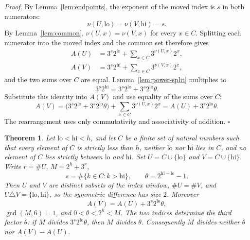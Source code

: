 \documentclass[11pt,letterpaper]{article}
\newtheorem{theorem}{Theorem}
\newenvironment{proof}{\noindent\textit{Proof.}}{\hfill\(\square\)}
\begin{document}
\begin{proof}
By Lemma~\ref{lem:endpoints}, the exponent of the moved index is \(s\) in both numerators:
\[
\nu(U,\mathrm{lo})=\nu(V,\mathrm{hi})=s.
\]
By Lemma~\ref{lem:common}, \(\nu(U,x)=\nu(V,x)\) for every \(x\in C\). Splitting each numerator into the moved index and the common set therefore gives
\begin{align*}
A(U)&=3^{s}2^{\mathrm{lo}}+\sum_{x\in C}3^{\nu(U,x)}2^{x},\\
A(V)&=3^{s}2^{\mathrm{hi}}+\sum_{x\in C}3^{\nu(V,x)}2^{x},
\end{align*}
and the two sums over \(C\) are equal. Lemma~\ref{lem:power-split} multiplies to
\[
3^{s}2^{\mathrm{hi}}=3^{s}2^{\mathrm{lo}}+3^{s}2^{\mathrm{lo}}\theta.
\]
Substitute this identity into \(A(V)\) and use equality of the sums over \(C\):
\[
A(V)=\bigl(3^{s}2^{\mathrm{lo}}+3^{s}2^{\mathrm{lo}}\theta\bigr)+\sum_{x\in C}3^{\nu(U,x)}2^{x}
=A(U)+3^{s}2^{\mathrm{lo}}\theta.
\]
The rearrangement uses only commutativity and associativity of addition.
\end{proof}

\begin{theorem}
\label{thm:nocrossing}
Let \(\mathrm{lo}<\mathrm{hi}<h\), and let \(C\) be a finite set of natural numbers such that every element of \(C\) is strictly less than \(h\), neither \(\mathrm{lo}\) nor \(\mathrm{hi}\) lies in \(C\), and no element of \(C\) lies strictly between \(\mathrm{lo}\) and \(\mathrm{hi}\). Set \(U=C\cup\{\mathrm{lo}\}\) and \(V=C\cup\{\mathrm{hi}\}\). Write \(r=\#U\), \(M=2^{h}+3^{r}\),
\[
s=\#\{k\in C:k>\mathrm{hi}\},\qquad\theta=2^{\mathrm{hi}-\mathrm{lo}}-1.
\]
Then \(U\) and \(V\) are distinct subsets of the index window, \(\#U=\#V\), and \(U\triangle V=\{\mathrm{lo},\mathrm{hi}\}\), so the symmetric difference has size \(2\). Moreover
\[
A(V)=A(U)+3^{s}2^{\mathrm{lo}}\theta,
\]
\(\gcd(M,6)=1\), and \(0<\theta<2^{h}<M\). The two indices determine the third factor \(\theta\): if \(M\) divides \(3^{s}2^{\mathrm{lo}}\theta\), then \(M\) divides \(\theta\). Consequently \(M\) divides neither \(\theta\) nor \(A(V)-A(U)\).
\end{theorem}
\end{document}
